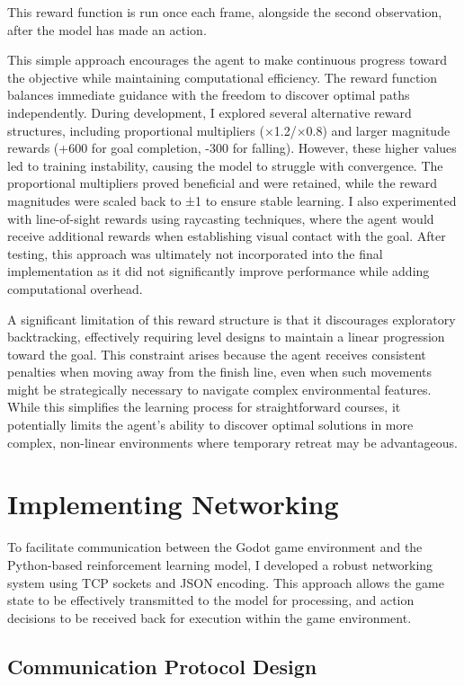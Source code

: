 This reward function is run once each frame, alongside the second observation, after the model has made an action.

This simple approach encourages the agent to make continuous progress toward the objective while maintaining computational efficiency. 
The reward function balances immediate guidance with the freedom to discover optimal paths independently.
During development, I explored several alternative reward structures, including proportional multipliers (×1.2/×0.8) and larger magnitude rewards (+600 for goal completion, -300 for falling). 
However, these higher values led to training instability, causing the model to struggle with convergence. The proportional multipliers proved beneficial and were retained, while the reward magnitudes were scaled back to ±1 to ensure stable learning.
I also experimented with line-of-sight rewards using raycasting techniques, where the agent would receive additional rewards when establishing visual contact with the goal. 
After testing, this approach was ultimately not incorporated into the final implementation as it did not significantly improve performance while adding computational overhead.

A significant limitation of this reward structure is that it discourages exploratory backtracking, effectively requiring level designs to maintain a linear progression toward the goal. 
This constraint arises because the agent receives consistent penalties when moving away from the finish line, even when such movements might be strategically necessary to navigate complex environmental features. 
While this simplifies the learning process for straightforward courses, it potentially limits the agent's ability to discover optimal solutions in more complex, non-linear environments where temporary retreat may be advantageous.

\section{Implementing Networking}

To facilitate communication between the Godot game environment and the Python-based reinforcement learning model, I developed a robust networking system using TCP sockets and JSON encoding. 
This approach allows the game state to be effectively transmitted to the model for processing, and action decisions to be received back for execution within the game environment.

\subsection{Communication Protocol Design}

